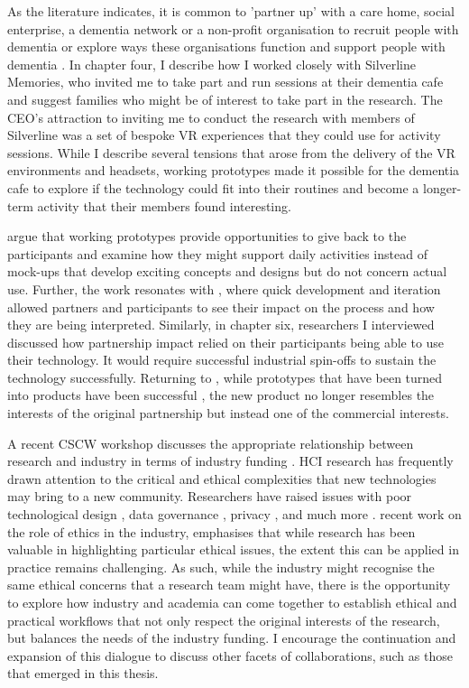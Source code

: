 As the literature indicates, it is common to 'partner up' with a care home, social enterprise, a dementia network or a non-profit organisation to recruit people with dementia or explore ways these organisations function and support people with dementia \citep{bartlett2019strategies}. In chapter four, I describe how I worked closely with Silverline Memories, who invited me to take part and run sessions at their dementia cafe and suggest families who might be of interest to take part in the research. The CEO's attraction to inviting me to conduct the research with members of Silverline was a set of bespoke VR experiences that they could use for activity sessions. While I describe several tensions that arose from the delivery of the VR environments and headsets, working prototypes made it possible for the dementia cafe to explore if the technology could fit into their routines and become a longer-term activity that their members found interesting. 

\cite{bodker2018participatory} argue that working prototypes provide opportunities to give back to the participants and examine how they might support daily activities instead of mock-ups that develop exciting concepts and designs but do not concern actual use. Further, the work resonates with \cite{lindsay_empathy_2012}, where quick development and iteration allowed partners and participants to see their impact on the process and how they are being interpreted. Similarly, in chapter six, researchers I interviewed discussed how partnership impact relied on their participants being able to use their technology. It would require successful industrial spin-offs to sustain the technology successfully. Returning to \cite{bodker2018participatory}, while prototypes that have been turned into products have been successful \citep{chilana2015user}, the new product no longer resembles the interests of the original partnership but instead one of the commercial interests. 

A recent CSCW workshop discusses the appropriate relationship between research and industry in terms of industry funding \citep{group_patron_2019}. HCI research has frequently drawn attention to the critical and ethical complexities that new technologies may bring to a new community. Researchers have raised issues with poor technological design \citep{ehrenkranz_men_nodate}, data governance \citep{albrecht_how_2016}, privacy \citep{west_data_2019}, and much more \citep{winston2013society}. \cite{longo2020value} recent work on the role of ethics in the industry, emphasises that while research has been valuable in highlighting particular ethical issues, the extent this can be applied in practice remains challenging. As such, while the industry might recognise the same ethical concerns that a research team might have, there is the opportunity to explore how industry and academia can come together to establish ethical and practical workflows that not only respect the original interests of the research, but balances the needs of the industry funding. I encourage the continuation and expansion of this dialogue to discuss other facets of collaborations, such as those that emerged in this thesis.

